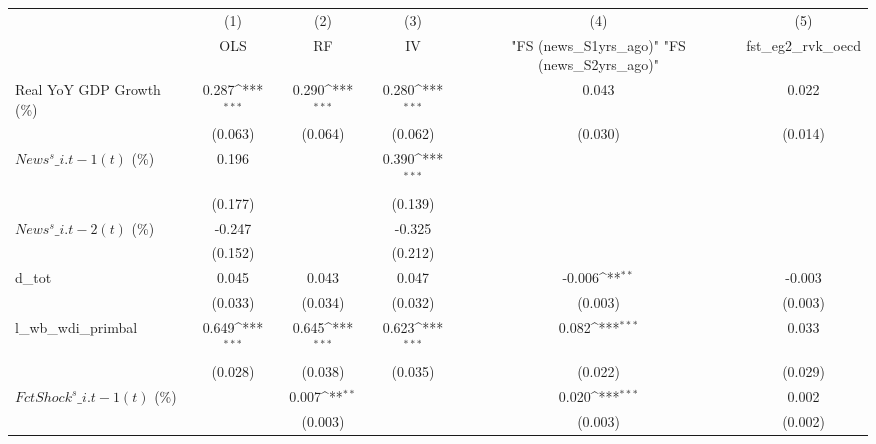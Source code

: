 {
\def\sym#1{\ifmmode^{#1}\else\(^{#1}\)\fi}
\begin{tabular}{l*{5}{c}}
\toprule
                    &\multicolumn{1}{c}{(1)}&\multicolumn{1}{c}{(2)}&\multicolumn{1}{c}{(3)}&\multicolumn{1}{c}{(4)}&\multicolumn{1}{c}{(5)}\\
                    &\multicolumn{1}{c}{OLS}&\multicolumn{1}{c}{RF}&\multicolumn{1}{c}{IV}&\multicolumn{1}{c}{ "FS (news\_S1yrs\_ago)"  "FS (news\_S2yrs\_ago)" }&\multicolumn{1}{c}{fst\_eg2\_rvk\_oecd}\\
\midrule
Real YoY GDP Growth (\%)&       0.287\sym{***}&       0.290\sym{***}&       0.280\sym{***}&       0.043         &       0.022         \\
                    &     (0.063)         &     (0.064)         &     (0.062)         &     (0.030)         &     (0.014)         \\
\addlinespace
$ News^s\_{i.t-1}(t)$ (\%)&       0.196         &                     &       0.390\sym{***}&                     &                     \\
                    &     (0.177)         &                     &     (0.139)         &                     &                     \\
\addlinespace
$ News^s\_{i.t-2}(t)$ (\%)&      -0.247         &                     &      -0.325         &                     &                     \\
                    &     (0.152)         &                     &     (0.212)         &                     &                     \\
\addlinespace
d\_tot               &       0.045         &       0.043         &       0.047         &      -0.006\sym{**} &      -0.003         \\
                    &     (0.033)         &     (0.034)         &     (0.032)         &     (0.003)         &     (0.003)         \\
\addlinespace
l\_wb\_wdi\_primbal    &       0.649\sym{***}&       0.645\sym{***}&       0.623\sym{***}&       0.082\sym{***}&       0.033         \\
                    &     (0.028)         &     (0.038)         &     (0.035)         &     (0.022)         &     (0.029)         \\
\addlinespace
$ FctShock^s\_{i.t-1}(t)$ (\%)&                     &       0.007\sym{**} &                     &       0.020\sym{***}&       0.002         \\
                    &                     &     (0.003)         &                     &     (0.003)         &     (0.002)         \\

\end{tabular}}
